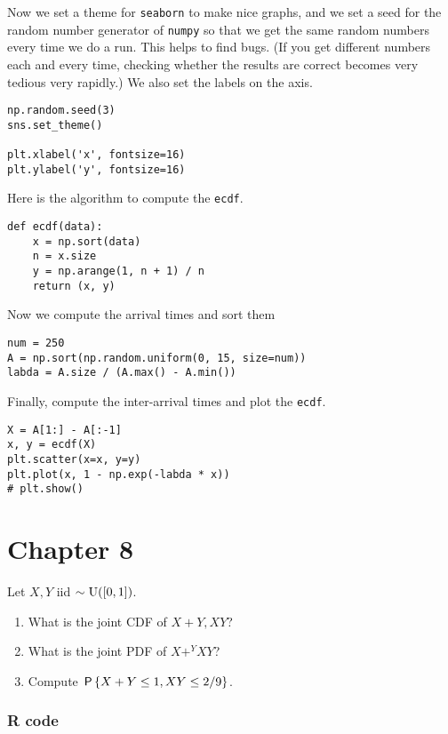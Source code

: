 \documentclass[a4paper]{article}
\begin{document}
Now we set a theme for \texttt{seaborn} to make nice graphs, and we set a seed for the random number generator of \texttt{numpy} so that we get the same random numbers every time we do a run.
This helps to find bugs.
(If you get different numbers each and every time, checking whether the results are correct becomes very tedious very rapidly.)
We also set the labels on the axis.

\begin{verbatim}
np.random.seed(3)
sns.set_theme()

plt.xlabel('x', fontsize=16)
plt.ylabel('y', fontsize=16)
\end{verbatim}


Here is the algorithm to compute the \texttt{ecdf}.
\begin{verbatim}
def ecdf(data):
    x = np.sort(data)
    n = x.size
    y = np.arange(1, n + 1) / n
    return (x, y)
\end{verbatim}

Now we compute the arrival times and sort them

\begin{verbatim}
num = 250
A = np.sort(np.random.uniform(0, 15, size=num))
labda = A.size / (A.max() - A.min()) 
\end{verbatim}

Finally, compute the inter-arrival times and plot the \texttt{ecdf}.
\begin{verbatim}
X = A[1:] - A[:-1]
x, y = ecdf(X)
plt.scatter(x=x, y=y)
plt.plot(x, 1 - np.exp(-labda * x))
# plt.show()

\end{verbatim}

\section{Chapter 8}
\label{sec:chapter-8}

\begin{exercise}
Let $X, Y$ iid $\sim \Unif{[0,1]}$. 
\begin{enumerate}
\item What is the joint CDF of $X+Y, XY$?
\item What is the joint PDF of $X+^Y XY$?
\item Compute $\P{X+Y\leq 1, XY\leq 2/9}$.
\end{enumerate}
\end{exercise}


\subsubsection*{R code}
\label{sec:orgbbfd4db}
\end{document}
